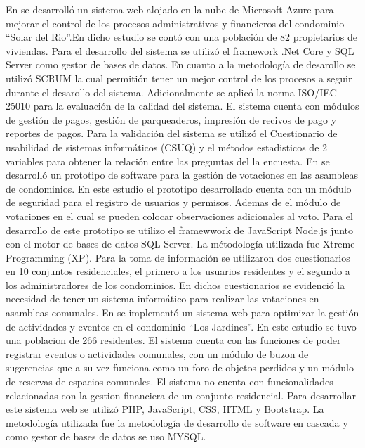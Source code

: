 \bigbreak
En\cite{moreiraDESARROLLOSISTEMAWEB2019} se desarrolló un sistema web alojado en la nube de Microsoft Azure para mejorar el control de los procesos administrativos y financieros del condominio {\textquotedblleft}Solar del Rio{\textquotedblright}.En dicho estudio se contó con una población de 82 propietarios de viviendas. Para el desarrollo del sistema se utilizó el framework .Net Core y SQL Server como gestor de bases de datos. En cuanto a la metodología de desarollo se utilizó SCRUM la cual permitión tener un mejor control de los procesos a seguir durante el desarollo del sistema. Adicionalmente se aplicó la norma ISO/IEC 25010 para la evaluación de la calidad del sistema. El sistema cuenta con módulos de gestión de pagos, gestión de parqueaderos, impresión de recivos de pago y reportes de pagos. Para la validación del sistema se utilizó el Cuestionario de usabilidad de sistemas informáticos (CSUQ) y el métodos estadisticos de 2 variables para obtener la relación entre las preguntas del la encuesta.
\bigbreak
En\cite{lopezPROTOTIPOSOFTWAREWEB2020} se desarrolló un prototipo de software para la gestión de votaciones en las asambleas de condominios. En este estudio el prototipo desarrollado cuenta con un módulo de seguridad para el registro de usuarios y permisos. Ademas de el módulo de votaciones en el cual se pueden colocar observaciones adicionales al voto. Para el desarrollo de este prototipo se utilizo el framewwork de JavaScript Node.js junto con el motor de bases de datos SQL Server. La métodología utilizada fue Xtreme Programming (XP). Para la toma de información se utilizaron dos cuestionarios en 10 conjuntos residenciales, el primero a los usuarios residentes y el segundo a los administradores de los condominios. En dichos cuestionarios se evidenció la necesidad de tener un sistema informático para realizar las votaciones en asambleas comunales.
\bigbreak
En\cite{ortegaPrototipoSistemaWeb2020} se implementó un sistema web para optimizar la gestión de actividades y eventos en el condominio {\textquotedblleft}Los Jardines{\textquotedblright}. En este estudio se tuvo una poblacion de 266 residentes. El sistema cuenta con las funciones de poder registrar eventos o actividades comunales, con un módulo de buzon de sugerencias que a su vez funciona como un foro de objetos perdidos y un módulo de reservas de espacios comunales. El sistema no cuenta con funcionalidades relacionadas con la gestion financiera de un conjunto residencial. Para desarrollar este sistema web se utilizó PHP, JavaScript, CSS, HTML y Bootstrap. La metodología utilizada fue la metodología de desarrollo de software en cascada y como gestor de bases de datos se uso MYSQL.

